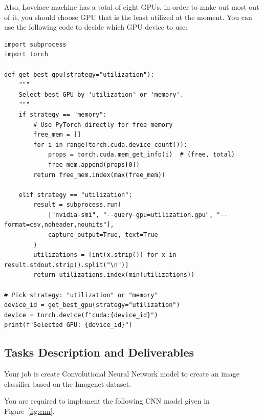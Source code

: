 \documentclass[12pt, xcolor=dvipsnames,svgnames,x11names]{article}
\begin{document}
Also, Lovelace machine has a total of eight GPUs, in order to make out most out of it, you should choose GPU that is the least utilized at the moment. You can use the following code to decide which GPU device to use:

\begin{verbatim}
import subprocess
import torch

def get_best_gpu(strategy="utilization"):
    """
    Select best GPU by 'utilization' or 'memory'.
    """
    if strategy == "memory":
        # Use PyTorch directly for free memory
        free_mem = []
        for i in range(torch.cuda.device_count()):
            props = torch.cuda.mem_get_info(i)  # (free, total)
            free_mem.append(props[0])
        return free_mem.index(max(free_mem))

    elif strategy == "utilization":
        result = subprocess.run(
            ["nvidia-smi", "--query-gpu=utilization.gpu", "--format=csv,noheader,nounits"],
            capture_output=True, text=True
        )
        utilizations = [int(x.strip()) for x in result.stdout.strip().split("\n")]
        return utilizations.index(min(utilizations))

# Pick strategy: "utilization" or "memory"
device_id = get_best_gpu(strategy="utilization")
device = torch.device(f"cuda:{device_id}")
print(f"Selected GPU: {device_id}")
\end{verbatim}


\subsection{Tasks Description and Deliverables}

Your job is create Convolutional Neural Network model to create an image classifier based on the Imagenet dataset.



You are required to implement the following CNN model given in Figure~\ref{fig:cnn}.
\end{document}

